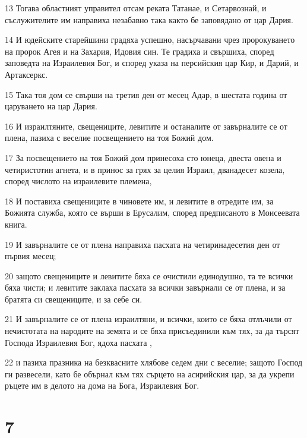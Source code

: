 \par 13 Тогава областният управител отсам реката Татанае, и Сетарвознай, и съслужителите им направиха незабавно така както бе заповядано от цар Дария.
\par 14 И юдейските старейшини градяха успешно, насърчавани чрез пророкуването на пророк Агея и на Захария, Идовия син. Те градиха и свършиха, според заповедта на Израилевия Бог, и според указа на персийския цар Кир, и Дарий, и Артаксеркс.
\par 15 Така тоя дом се свърши на третия ден от месец Адар, в шестата година от царуването на цар Дария.
\par 16 И израилтяните, свещениците, левитите и останалите от завърналите се от плена, пазиха с веселие посвещението на тоя Божий дом.
\par 17 За посвещението на тоя Божий дом принесоха сто юнеца, двеста овена и четиристотин агнета, и в принос за грях за целия Израил, дванадесет козела, според числото на израилевите племена,
\par 18 И поставиха свещениците в чиновете им, и левитите в отредите им, за Божията служба, която се върши в Ерусалим, според предписаното в Моисеевата книга.
\par 19 И завърналите се от плена направиха пасхата на четиринадесетия ден от първия месец;
\par 20 защото свещениците и левитите бяха се очистили единодушно, та те всички бяха чисти; и левитите заклаха пасхата за всички завърнали се от плена, и за братята си свещениците, и за себе си.
\par 21 И завърналите се от плена израилтяни, и всички, които се бяха отлъчили от нечистотата на народите на земята и се бяха присъединили към тях, за да търсят Господа Израилевия Бог, ядоха пасхата ,
\par 22 и пазиха празника на безквасните хлябове седем дни с веселие; защото Господ ги развесели, като бе обърнал към тях сърцето на асирийския цар, за да укрепи ръцете им в делото на дома на Бога, Израилевия Бог.

\chapter{7}

